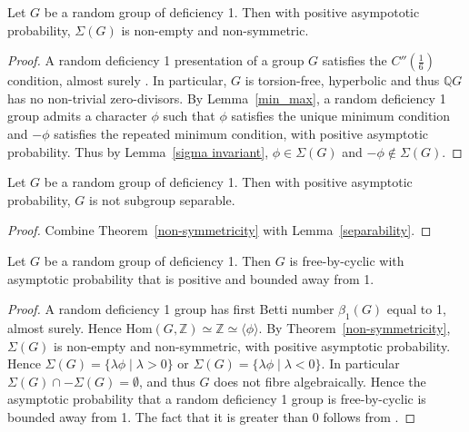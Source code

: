 \begin{thm}\label{non-symmetricity}
Let $G$ be a random group of deficiency 1. Then with positive asympototic probability, $\Sigma(G)$ is non-empty and non-symmetric. 
\end{thm}

\begin{proof}
A random deficiency 1 presentation of a group $G$ satisfies the $C''(\frac{1}{6})$ condition, almost surely \cite{Gromov1993}. In particular, $G$ is torsion-free, hyperbolic and thus $\mathbb{Q}G$ has no non-trivial zero-divisors. By Lemma~\ref{min_max}, a random deficiency 1 group admits a character $\phi$ such that $\phi$ satisfies the unique minimum condition and $-\phi$ satisfies the repeated minimum condition, with positive asymptotic probability. Thus by Lemma~\ref{sigma invariant}, $\phi \in \Sigma(G)$ and $-\phi \not \in \Sigma(G)$.\end{proof}


\begin{corollary}
Let $G$ be a random group of deficiency 1. Then with positive asymptotic probability, $G$ is not subgroup separable.
\end{corollary}

\begin{proof}
Combine Theorem~\ref{non-symmetricity} with Lemma~\ref{separability}.\end{proof}


\begin{corollary}
Let $G$ be a random group of deficiency 1. Then $G$ is free-by-cyclic with asymptotic probability that is positive and bounded away from 1.
\end{corollary}

\begin{proof}
A random deficiency 1 group has first Betti number $\beta_1(G)$ equal to 1, almost surely. Hence $\mathrm{Hom}(G, \mathbb{Z}) \simeq \mathbb{Z} \simeq \langle \phi \rangle$. By Theorem~\ref{non-symmetricity}, $\Sigma(G)$ is non-empty and non-symmetric, with positive asymptotic probability. Hence $\Sigma(G) = \{\lambda \phi \mid \lambda > 0\}$ or $\Sigma(G) = \{\lambda \phi \mid \lambda < 0\}.$ In particular $\Sigma(G) \cap - \Sigma(G) = \emptyset$, and thus $G$ does not fibre algebraically. Hence the asymptotic probability that a random deficiency 1 group is free-by-cyclic is bounded away from 1. The fact that it is greater than 0 follows from \cite[Theorem~A]{KKW}.\end{proof}







